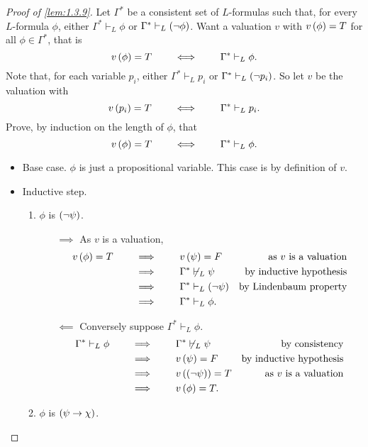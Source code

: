 \begin{proof}[Proof of \ref{lem:1.3.9}]
Let $ \Gamma^* $ be a consistent set of $ L $-formulas such that, for every $ L $-formula $ \phi $, either $ \Gamma^* \vdash_L \phi $ or $ \Gamma^* \vdash_L \left( \neg \phi \right) $. Want a valuation $ v $ with $ v\left( \phi \right) = T $ for all $ \phi \in \Gamma^* $, that is
$$ v\left( \phi \right) = T \qquad \iff \qquad \Gamma^* \vdash_L \phi. $$
Note that, for each variable $ p_i $, either $ \Gamma^* \vdash_L p_i $ or $ \Gamma^* \vdash_L \left( \neg p_i \right) $. So let $ v $ be the valuation with
$$ v\left( p_i \right) = T \qquad \iff \qquad \Gamma^* \vdash_L p_i. $$
Prove, by induction on the length of $ \phi $, that
$$ v\left( \phi \right) = T \qquad \iff \qquad \Gamma^* \vdash_L \phi. $$
\begin{itemize}
\item Base case. $ \phi $ is just a propositional variable. This case is by definition of $ v $.
\item Inductive step.
\begin{enumerate}[leftmargin=0.5in, label=Case \arabic*.]
\item $ \phi $ is $ \left( \neg \psi \right) $.
\begin{itemize}
\item[$ \implies $] As $ v $ is a valuation,
\begin{align*}
v\left( \phi \right) = T \qquad
& \implies \qquad v\left( \psi \right) = F & \text{as} \ v \ \text{is a valuation} \\
& \implies \qquad \Gamma^* \not\vdash_L \psi & \text{by inductive hypothesis} \\
& \implies \qquad \Gamma^* \vdash_L \left( \neg \psi \right) & \text{by Lindenbaum property} \\
& \implies \qquad \Gamma^* \vdash_L \phi.
\end{align*}
\item[$ \impliedby $] Conversely suppose $ \Gamma^* \vdash_L \phi $.
\begin{align*}
\Gamma^* \vdash_L \phi \qquad
& \implies \qquad \Gamma^* \not\vdash_L \psi & \text{by consistency} \\
& \implies \qquad v\rb{\psi} = F & \text{by inductive hypothesis} \\
& \implies \qquad v\rb{\notb{\psi}} = T & \text{as} \ v \ \text{is a valuation} \\
& \implies \qquad v\rb{\phi} = T.
\end{align*}
\pagebreak
\end{itemize}
\item $ \phi $ is $ \left( \psi \rightarrow \chi \right) $.
\begin{itemize}

\end{itemize}
\end{enumerate}
\end{itemize}
\end{proof}
